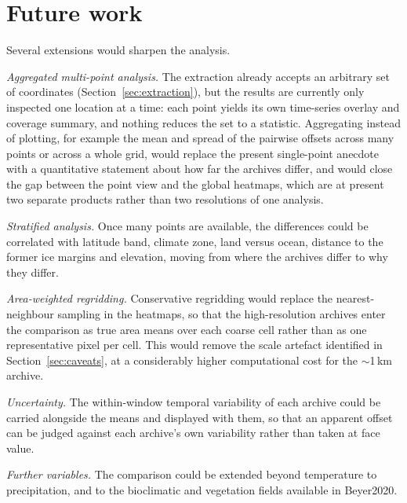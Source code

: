 \documentclass{isprs}
\begin{document}
\section{Future work}
Several extensions would sharpen the analysis.

\emph{Aggregated multi-point analysis.} The extraction already accepts an arbitrary set of coordinates (Section~\ref{sec:extraction}), but the results are currently only inspected one location at a time: each point yields its own time-series overlay and coverage summary, and nothing reduces the set to a statistic. Aggregating instead of plotting, for example the mean and spread of the pairwise offsets across many points or across a whole grid, would replace the present single-point anecdote with a quantitative statement about how far the archives differ, and would close the gap between the point view and the global heatmaps, which are at present two separate products rather than two resolutions of one analysis.

\emph{Stratified analysis.} Once many points are available, the differences could be correlated with latitude band, climate zone, land versus ocean, distance to the former ice margins and elevation, moving from where the archives differ to why they differ.

\emph{Area-weighted regridding.} Conservative regridding would replace the nearest-neighbour sampling in the heatmaps, so that the high-resolution archives enter the comparison as true area means over each coarse cell rather than as one representative pixel per cell. This would remove the scale artefact identified in Section~\ref{sec:caveats}, at a considerably higher computational cost for the $\sim$1\,km archive.

\emph{Uncertainty.} The within-window temporal variability of each archive could be carried alongside the means and displayed with them, so that an apparent offset can be judged against each archive's own variability rather than taken at face value.

\emph{Further variables.} The comparison could be extended beyond
temperature to precipitation, and to the bioclimatic and vegetation fields available in Beyer2020.
\end{document}
